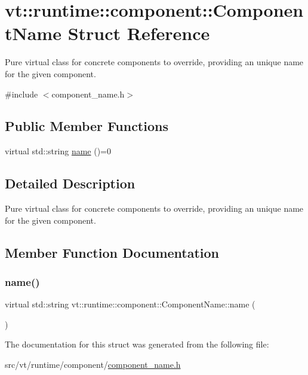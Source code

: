 \hypertarget{structvt_1_1runtime_1_1component_1_1_component_name}{}\section{vt\+:\+:runtime\+:\+:component\+:\+:Component\+Name Struct Reference}
\label{structvt_1_1runtime_1_1component_1_1_component_name}


Pure virtual class for concrete components to override, providing an unique name for the given component.  




{\ttfamily \#include $<$component\+\_\+name.\+h$>$}

\subsection*{Public Member Functions}
\begin{DoxyCompactItemize}
\item 
virtual std\+::string \hyperlink{structvt_1_1runtime_1_1component_1_1_component_name_a33c06229bb605a2b2ceff68830d6d773}{name} ()=0
\end{DoxyCompactItemize}


\subsection{Detailed Description}
Pure virtual class for concrete components to override, providing an unique name for the given component. 

\subsection{Member Function Documentation}
\mbox{\label{structvt_1_1runtime_1_1component_1_1_component_name_a33c06229bb605a2b2ceff68830d6d773}} 
\subsubsection{\texorpdfstring{name()}{name()}}
{\footnotesize\ttfamily virtual std\+::string vt\+::runtime\+::component\+::\+Component\+Name\+::name (\begin{DoxyParamCaption}{ }\end{DoxyParamCaption})\hspace{0.3cm}{\ttfamily [pure virtual]}}



The documentation for this struct was generated from the following file\+:\begin{DoxyCompactItemize}
\item 
src/vt/runtime/component/\hyperlink{component__name_8h}{component\+\_\+name.\+h}\end{DoxyCompactItemize}
